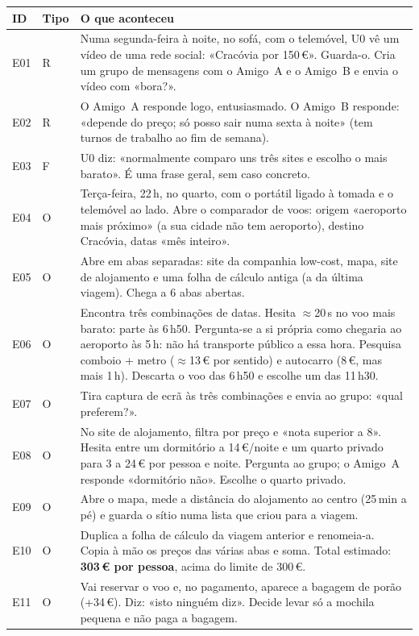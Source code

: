 \documentclass[11pt,a4paper]{article}
\begin{document}
{\small
\begin{longtable}{@{}p{0.9cm}p{0.7cm}p{13.6cm}@{}}
\toprule
\textbf{ID} & \textbf{Tipo} & \textbf{O que aconteceu} \\ \midrule \endhead
E01 & R & Numa segunda-feira à noite, no sofá, com o telemóvel, U0 vê um vídeo de uma rede social: «Cracóvia por 150\,€». Guarda-o. Cria um grupo de mensagens com o Amigo~A e o Amigo~B e envia o vídeo com «bora?». \\
E02 & R & O Amigo~A responde logo, entusiasmado. O Amigo~B responde: «depende do preço; só posso sair numa sexta à noite» (tem turnos de trabalho ao fim de semana). \\
E03 & F & U0 diz: «normalmente comparo uns três sites e escolho o mais barato». É uma frase geral, sem caso concreto. \\
E04 & O & Terça-feira, 22\,h, no quarto, com o portátil ligado à tomada e o telemóvel ao lado. Abre o comparador de voos: origem «aeroporto mais próximo» (a sua cidade não tem aeroporto), destino Cracóvia, datas «mês inteiro». \\
E05 & O & Abre em abas separadas: site da companhia low-cost, mapa, site de alojamento e uma folha de cálculo antiga (a da última viagem). Chega a 6 abas abertas. \\
E06 & O & Encontra três combinações de datas. Hesita \(\approx\)20\,s no voo mais barato: parte às 6\,h50. Pergunta-se a si própria como chegaria ao aeroporto às 5\,h: não há transporte público a essa hora. Pesquisa comboio + metro (\(\approx\)13\,€ por sentido) e autocarro (8\,€, mas mais 1\,h). Descarta o voo das 6\,h50 e escolhe um das 11\,h30. \\
E07 & O & Tira captura de ecrã às três combinações e envia ao grupo: «qual preferem?». \\
E08 & O & No site de alojamento, filtra por preço e «nota superior a 8». Hesita entre um dormitório a 14\,€/noite e um quarto privado para 3 a 24\,€ por pessoa e noite. Pergunta ao grupo; o Amigo~A responde «dormitório não». Escolhe o quarto privado. \\
E09 & O & Abre o mapa, mede a distância do alojamento ao centro (25\,min a pé) e guarda o sítio numa lista que criou para a viagem. \\
E10 & O & Duplica a folha de cálculo da viagem anterior e renomeia-a. Copia à mão os preços das várias abas e soma. Total estimado: \textbf{303\,€ por pessoa}, acima do limite de 300\,€. \\
E11 & O & Vai reservar o voo e, no pagamento, aparece a bagagem de porão (+34\,€). Diz: «isto ninguém diz». Decide levar só a mochila pequena e não paga a bagagem. \\

\end{longtable}}
\end{document}
